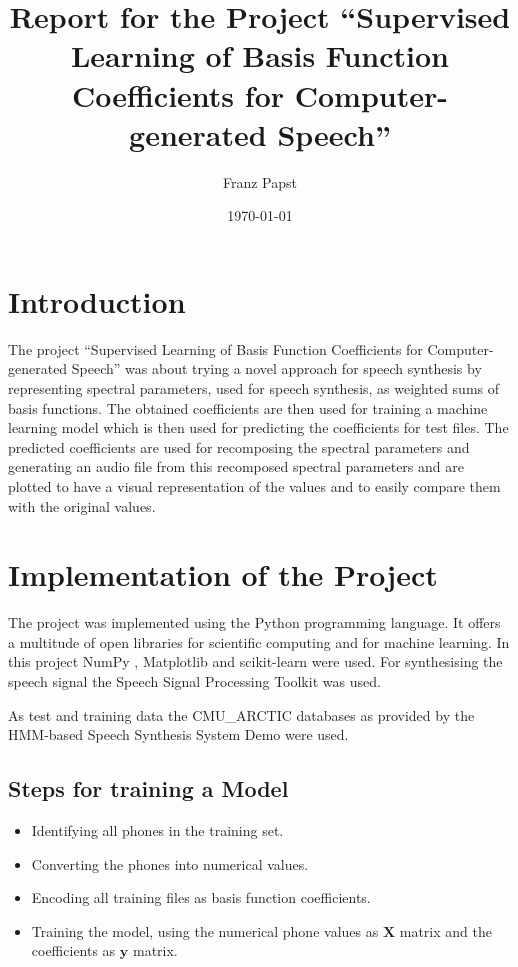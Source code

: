 \documentclass{article}
\begin{document}
\title{Report for the Project	``Supervised Learning of Basis Function 
Coefficients for Computer-generated Speech''}
\date{\today}
\author{Franz Papst}
\maketitle

\section{Introduction}
The project ``Supervised Learning of Basis Function Coefficients for 
Computer-generated Speech'' was about trying a novel approach for speech 
synthesis by representing spectral parameters, used for speech synthesis, as 
weighted sums of basis functions. The obtained coefficients are then used for 
training a machine learning model which is then used for predicting the 
coefficients for test files. The predicted coefficients are used for 
recomposing the spectral parameters and generating an audio file from this 
recomposed spectral parameters and are plotted to have a visual representation 
of the values and to easily compare them with the original values.

\section{Implementation of the Project}
The project was implemented using the Python programming language. It offers a 
multitude of open libraries for scientific computing and for machine learning. 
In this project NumPy \cite{numpy}, Matplotlib \cite{matplotlib} and 
scikit-learn \cite{scikit-learn} were used. For synthesising the speech signal 
the Speech Signal Processing Toolkit \cite{sptk} was used.

As test and training data the CMU\_ARCTIC databases \cite{CMU_arctic} as 
provided by the HMM-based Speech Synthesis System Demo \cite{hts} were used.

\subsection{Steps for training a Model}
\begin{itemize}
	\item Identifying all phones in the training set.
	\item Converting the phones into numerical values.
	\item Encoding all training files as basis function coefficients.
	\item Training the model, using the numerical phone values as $\mathbf{X}$ 
	matrix and the coefficients as $\mathbf{y}$ matrix.
\end{itemize}
\end{document}
